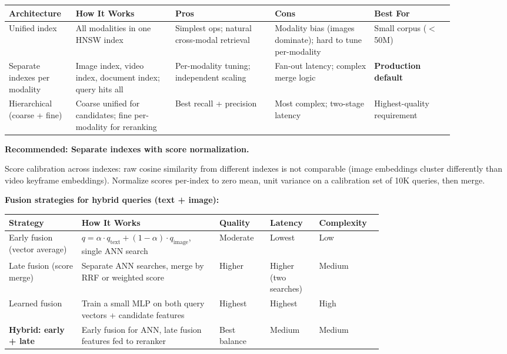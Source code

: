 \begin{tabular}{|p{0.12\linewidth}|p{0.20\linewidth}|p{0.20\linewidth}|p{0.20\linewidth}|p{0.16\linewidth}|}
\hline
\textbf{Architecture} & \textbf{How It Works} & \textbf{Pros} & \textbf{Cons} & \textbf{Best For} \\
\hline
Unified index & All modalities in one HNSW index & Simplest ops; natural cross-modal retrieval & Modality bias (images dominate); hard to tune per-modality & Small corpus ($<$50M) \\
\hline
Separate indexes per modality & Image index, video index, document index; query hits all & Per-modality tuning; independent scaling & Fan-out latency; complex merge logic & \textbf{Production default} \\
\hline
Hierarchical (coarse + fine) & Coarse unified for candidates; fine per-modality for reranking & Best recall + precision & Most complex; two-stage latency & Highest-quality requirement \\
\hline
\end{tabular}

\textbf{Recommended: Separate indexes with score normalization.}

Score calibration across indexes: raw cosine similarity from different indexes is not comparable (image embeddings cluster differently than video keyframe embeddings). Normalize scores per-index to zero mean, unit variance on a calibration set of 10K queries, then merge.

\textbf{Fusion strategies for hybrid queries (text + image):}

\begin{tabular}{|p{0.16\linewidth}|p{0.28\linewidth}|p{0.10\linewidth}|p{0.10\linewidth}|p{0.10\linewidth}|}
\hline
\textbf{Strategy} & \textbf{How It Works} & \textbf{Quality} & \textbf{Latency} & \textbf{Complexity} \\
\hline
Early fusion (vector average) & $q = \alpha \cdot q_{\text{text}} + (1-\alpha) \cdot q_{\text{image}}$, single ANN search & Moderate & Lowest & Low \\
\hline
Late fusion (score merge) & Separate ANN searches, merge by RRF or weighted score & Higher & Higher (two searches) & Medium \\
\hline
Learned fusion & Train a small MLP on both query vectors + candidate features & Highest & Highest & High \\
\hline
\textbf{Hybrid: early + late} & Early fusion for ANN, late fusion features fed to reranker & Best balance & Medium & Medium \\
\hline
\end{tabular}


